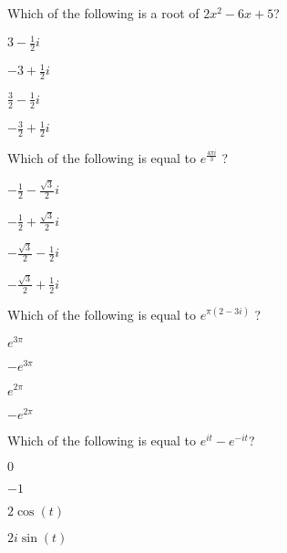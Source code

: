 \begin{readinessAssuranceTest}
\setlength{\itemsep}{0.6in}


\item Which of the following is a root of \(2x^2-6x+5\)?
\begin{multicols}{4}
\begin{readinessAssuranceTestChoices}
\item \(3-\frac{1}{2}i\)
\item \(-3+\frac{1}{2}i\)
\item \(\frac{3}{2}-\frac{1}{2}i\) %
\item \(-\frac{3}{2}+\frac{1}{2}i\)
\end{readinessAssuranceTestChoices}
\end{multicols}

\item Which of the following is equal to \(e^{\frac{4\pi i}{3}}\) ?
\begin{multicols}{4}
\begin{readinessAssuranceTestChoices}
\item \(-\frac{1}{2}-\frac{\sqrt{3}}{2}i \) %
\item \(-\frac{1}{2}+\frac{\sqrt{3}}{2}i \)
\item \(-\frac{\sqrt{3}}{2}-\frac{1}{2}i \)
\item \(-\frac{\sqrt{3}}{2}+\frac{1}{2}i \)
\end{readinessAssuranceTestChoices}
\end{multicols}

\item Which of the following is equal to \(e^{\pi (2-3i)}\) ?
\begin{multicols}{4}
\begin{readinessAssuranceTestChoices}
\item \( e^{3\pi} \)
\item \(-e^{3\pi} \)
\item \( e^{2\pi} \)
\item \(-e^{2\pi} \) %
\end{readinessAssuranceTestChoices}
\end{multicols}

\item Which of the following is equal to \( e^{it}-e^{-it} \)?
\begin{multicols}{4}
\begin{readinessAssuranceTestChoices}
\item \( 0 \)
\item \( -1 \)
\item \( 2 \cos(t) \)
\item \( 2i \sin(t) \) %
\end{readinessAssuranceTestChoices}
\end{multicols}


\end{readinessAssuranceTest}
